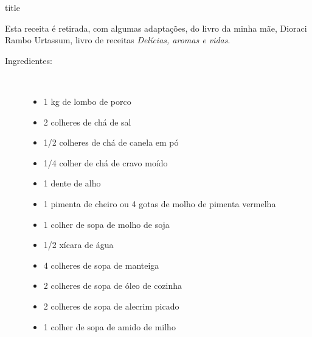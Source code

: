 \documentclass [11pt, papel de carta] {article}
\begin{document}
 {title}

\begin {flushright}
Esta receita é retirada, com algumas adaptações, do livro da minha mãe, Dioraci Rambo Urtassum, livro de receitas {\it Delícias, aromas e vidas}.
\end {flushright}

\begin {description}

\item [Ingredientes:] \ \\
\begin {itemize}
\item 1 kg de lombo de porco
\item 2 colheres de chá de sal
\item 1/2 colheres de chá de canela em pó
\item 1/4 colher de chá de cravo moído
\item 1 dente de alho
\item 1 pimenta de cheiro ou 4 gotas de molho de pimenta vermelha
\item 1 colher de sopa de molho de soja
\item 1/2 xícara de água
\item 4 colheres de sopa de manteiga
\item 2 colheres de sopa de óleo de cozinha
\item 2 colheres de sopa de alecrim picado
\item 1 colher de sopa de amido de milho
\end {itemize}



\end{description}
\end{document}
